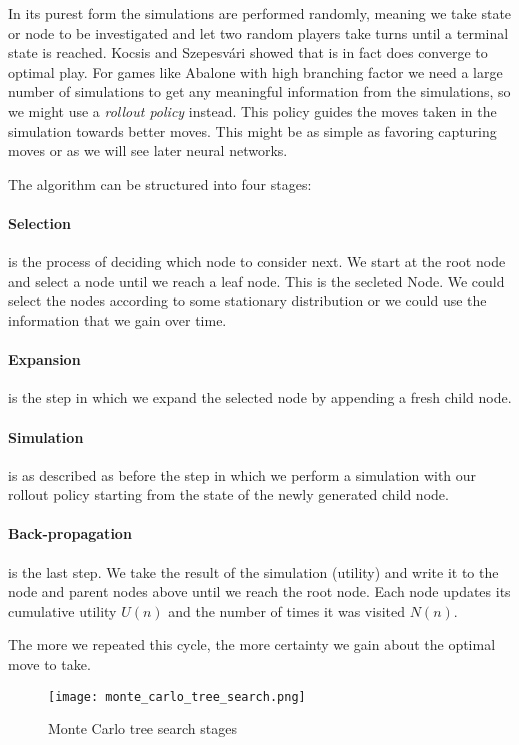 In its purest form the simulations are performed randomly, meaning we take state or node to be investigated and let two random players take turns until a terminal state is reached. Kocsis and Szepesvári \cite{kocsis_bandit_2006} showed that is in fact does converge to optimal play. For games like Abalone with high branching factor we need a large number of simulations to get any meaningful information from the simulations, so we might use a \textit{rollout policy} instead. This policy guides the moves taken in the simulation towards better moves. This might be as simple as favoring capturing moves or as we will see later neural networks.

The algorithm can be structured into four stages:

\paragraph{Selection} is the process of deciding which node to consider next. We start at the root node and select a node until we reach a leaf node. This is the secleted Node. We could select the nodes according to some stationary distribution or we could use the information that we gain over time.

\paragraph{Expansion} is the step in which we expand the selected node by appending a fresh child node.

\paragraph{Simulation} is as described as before the step in which we perform a simulation with our rollout policy starting from the state of the newly generated child node.

\paragraph{Back-propagation} is the last step. We take the result of the simulation (utility) and write it to the node and parent nodes above until we reach the root node. Each node updates its cumulative utility $U(n)$ and the number of times it was visited $N(n)$.

The more we repeated this cycle, the more certainty we gain about the optimal move to take.

\begin{figure}
    \centering
    \texttt{[image: monte\_carlo\_tree\_search.png]}
    \caption{Monte Carlo tree search stages \cite{noauthor_fig_nodate}}
    \label{monte_carlo_tree_search}
\end{figure}

